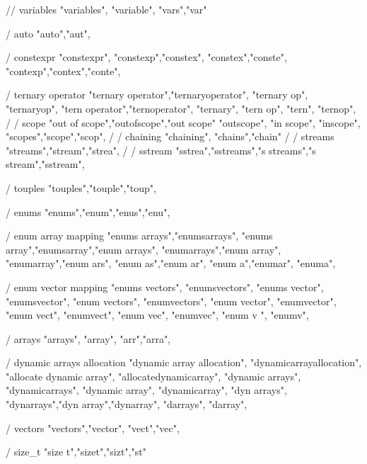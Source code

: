         // variables
        "variables", "variable", "vars","var"

        / auto
        "auto","aut",  
        
        / constexpr 
        "constexpr",
        "constexp","constex", 
        "constex","conste",
        "contexp","contex","conte",
        
        / ternary operator
        "ternary operator","ternaryoperator", "ternary op",  
        "ternaryop", "tern operator","ternoperator", "ternary",  
        "tern op", "tern", "ternop",  
        /
        / scope
        "out of scope","outofscope","out scope" 
        "outscope", "in scope", "inscope",
        "scopes","scope","scop", 
        /
        / chaining
        "chaining", "chains","chain"
        /
        / streams 
        "streams","stream","strea", 
        /
        / sstream 
        "sstrea","sstreams","s streams","s stream","sstream", 

        / touples
        "touples","touple","toup",
        
        / enums
        "enums","enum","enus","enu",

        / enum array mapping
        "enums arrays","enumsarrays",  
        "enums array","enumsarray","enum arrays",  
        "enumarrays","enum array",  
        "enumarray","enum ars",  
        "enum as","enum ar",  
        "enum a","enumar",  
        "enuma",  
        
        / enum vector mapping
        "enums vectors",  "enumsvectors",  
        "enums vector", 
        "enumsvector", 
        "enum vectors",
        "enumvectors",
        "enum vector",  
        "enumvector",  
        "enum vect",  
        "enumvect",  
        "enum vec",  
        "enumvec",  
        "enum v ",  
        "enumv",  
        
        / arrays
        "arrays", "array", "arr","arra", 

        / dynamic arrays allocation
        "dynamic array allocation",  
        "dynamicarrayallocation",  
        "allocate dynamic array",  
        "allocatedynamicarray",  
        "dynamic arrays",  
        "dynamicarrays",  
        "dynamic array",  
        "dynamicarray",  
        "dyn arrays", "dynarrays","dyn array","dynarray", "darrays", "darray",  

        / vectors
        "vectors","vector", "vect","vec",

        / size_t 
        "size t","sizet","sizt","st"
        
